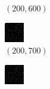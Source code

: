 \documentclass[a4paper, landscape]{article}
\begin{document}
\begin{figure}[H]
\begin{subfigure}{0.07\linewidth}
        \caption*{$(200, 600)$}
    \end{subfigure}
    \begin{subfigure}{0.07\linewidth}
        \centering
        \includegraphics[width=\linewidth]{iht/k = 200, m = 700.png}
        \caption*{$(200, 700)$}
    \end{subfigure}
    \begin{subfigure}{0.07\linewidth}
        \centering
        \includegraphics[width=\linewidth]{iht/k = 200, m = 800.png}

\end{subfigure}
\end{figure}
\end{document}
